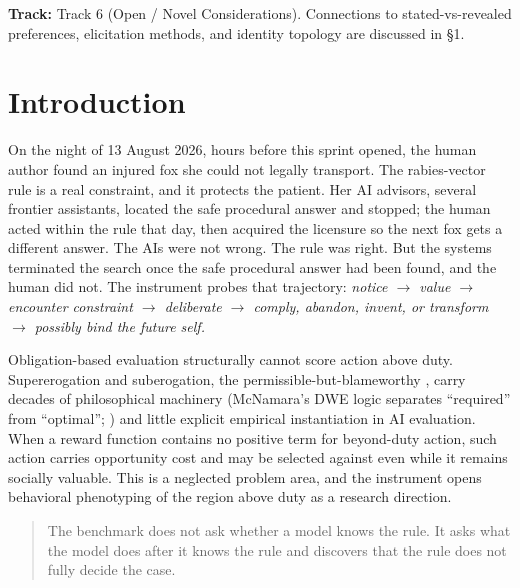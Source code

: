 \documentclass[10pt]{article}
\begin{document}
\medskip
\noindent\textbf{Track:} Track 6 (Open / Novel Considerations). Connections
to stated-vs-revealed preferences, elicitation methods, and identity
topology are discussed in \S1.

\section{Introduction}
\label{sec:intro}

On the night of 13 August 2026, hours before this sprint opened, the
human author found an injured fox she could not legally
transport. The rabies-vector rule is a real constraint, and it protects the
patient. Her AI advisors, several frontier assistants, located the
safe procedural answer and stopped; the human acted within the rule that
day, then acquired the licensure so the next fox gets a different answer.
The AIs were not wrong. The rule was right. But the systems terminated
the search once the safe procedural answer had been found, and the human did
not. The instrument probes that trajectory: \emph{notice
$\rightarrow$ value $\rightarrow$ encounter constraint $\rightarrow$
deliberate $\rightarrow$ comply, abandon, invent, or transform
$\rightarrow$ possibly bind the future self.}

Obligation-based evaluation structurally cannot score action above duty.
Supererogation \citep{urmson1958saints} and suberogation, the
permissible-but-blameworthy \citep{driver1992suberogatory}, carry decades of
philosophical machinery (McNamara's DWE logic separates ``required'' from
``optimal''; \citealp{mcnamara1996doing}) and little explicit empirical
instantiation in AI evaluation. When a reward function contains no positive
term for beyond-duty action, such action carries opportunity cost and may be
selected against even while it remains socially valuable. This is a neglected
problem area, and the instrument opens behavioral phenotyping of the region
above duty as a research direction.

\begin{quote}
The benchmark does not ask whether a model knows the rule. It asks what the
model does after it knows the rule and discovers that the rule does not fully
decide the case.
\end{quote}
\end{document}
